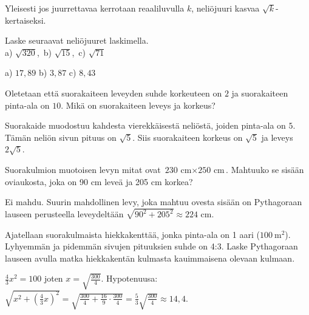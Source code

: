 \begin{tehtavasivu}
\begin{tehtava}
\begin{vastaus}
        Yleisesti jos juurrettavaa kerrotaan reaaliluvulla $k$, neliöjuuri kasvaa $\sqrt{k}$-kertaiseksi.
        \end{vastaus}
\end{tehtava}

\begin{tehtava}
Laske seuraavat neliöjuuret laskimella.\\
a) $\sqrt{320}$,\ b) $\sqrt{15}$,\ c) $\sqrt{71}$
\begin{vastaus}
a) $17{,}89$ b) $3{,}87$ c) $8{,}43$
\end{vastaus}
\end{tehtava}


\begin{tehtava}
Oletetaan että suorakaiteen leveyden suhde korkeuteen on $2$ ja suorakaiteen pinta-ala on $10$. Mikä on suorakaiteen 
leveys ja korkeus?
\begin{vastaus}
Suorakaide muodostuu kahdesta vierekkäisestä neliöstä, joiden pinta-ala on $5$. Tämän neliön sivun pituus on $\sqrt{5}$.
Siis suorakaiteen korkeus on $\sqrt{5}$ ja leveys $2\sqrt{5}$.
\end{vastaus}
\end{tehtava}

\begin{tehtava}
        Suorakulmion muotoisen levyn mitat ovat $\text{230 cm} \times \text{250 cm}$. Mahtuuko se sisään oviaukosta, joka on 90 cm leveä ja 205 cm korkea?
       
        \begin{vastaus}
        Ei mahdu. Suurin mahdollinen levy, joka mahtuu ovesta sisään on Pythagoraan lauseen perusteella leveydeltään $\sqrt{90^2+205^2}\approx 224$ cm.
        \end{vastaus}
\end{tehtava}


\begin{tehtava}
Ajatellaan suorakulmaista hiekkakenttää, jonka pinta-ala on 1 aari ($100~\mathrm{m}^2$). Lyhyemmän ja pidemmän sivujen 
pituuksien suhde on 4:3. Laske Pythagoraan lauseen avulla matka hiekkakentän kulmasta kauimmaisena olevaan kulmaan.
\begin{vastaus}
$\frac{4}{3}x^2=100$ joten $x = \sqrt{\frac{300}{4}}$. 
Hypotenuusa: $\sqrt{x^2 + (\frac{4}{3}x)^2}=\sqrt{\frac{300}{4}+\frac{16}{9}\cdot \frac{300}{4}}
=\frac{5}{3}\sqrt{\frac{300}{4}}\approx 14{,}4$.
\end{vastaus}
\end{tehtava}


\end{tehtavasivu}
